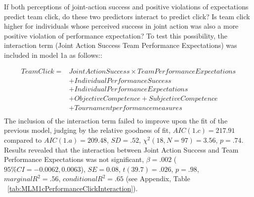 If both perceptions of joint-action success and positive violations of expectations predict team click, do these two predictors interact to predict click? Is team click higher for individuals whose perceived success in joint action was also a more positive violation of performance expectation? To test this possibility, the interaction term (Joint Action Success \times Team Performance Expectations) was included in model 1a as follows::

\begin{equation}
  \begin{align*}
    Team Click =  & Joint Action Success \times Team Performance Expectations \\
              &+ Individual Performance Success \\
              &+ Individual Performance Expectations \\
              &+ Objective Competence + Subjective Competence  \\
              &+ Tournament performance measures \\
  \end{align*}
\end{equation}
\bigskip
The inclusion of the interaction term failed to improve upon the fit of the previous model, judging by the relative goodness of fit, $AIC(1.c) = 217.91$ compared to $AIC(1.a) = 209.48$, $SD = .52 $, $\chi^2(18, N = 97) = 3.56$, $ p =.74$.  Results revealed that the interaction between Joint Action Success and Team Performance Expectations was not significant, $\beta = .002$ ($95\% CI =  -0.0062, 0.0063$), $SE = 0.08$, $t(39.7) = .026$, $p = .98$, $marginal R^2 = .56$, $conditional R^2 = .65$ (see Appendix, Table ~\ref{tab:MLM1cPerformanceClickInteraction}).




